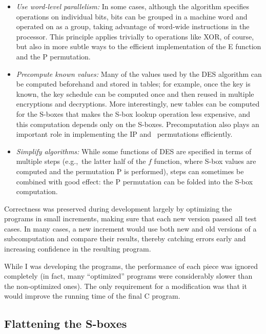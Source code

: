 \begin{itemize}
\item
{\em Use word-level parallelism:} In some cases, although the algorithm
specifies operations on individual bits, bits can be grouped in a
machine word and operated on as a group, taking advantage of word-wide
instructions in the processor.  This principle applies trivially to
operations like XOR, of course, but also in more subtle ways to the
efficient implementation of the E function and the P permutation.

\item
{\em Precompute known values:}  Many of the values used by the DES
algorithm can be computed beforehand and stored in tables; for example,
once the key is known, the key schedule can be computed once and then
reused in multiple encryptions and decryptions.  More interestingly,
new tables can be computed for the S-boxes that makes the S-box lookup
operation less expensive, and this computation depends only on the
S-boxes.  Precomputation also plays an important role in implementing the
IP and \ipinv\ permutations efficiently.

\item
{\em Simplify algorithms:} While some functions of DES are specified in
terms of multiple steps (e.g.,~the latter half of the $f$ function,
where S-box values are computed and the permutation P is performed), steps
can sometimes be combined with good effect: the P permutation can be
folded into the S-box computation.

\end{itemize}

Correctness was preserved during development largely by optimizing the
programs in small increments, making sure that each new version passed
all test cases.  In many cases, a new increment would use both new and
old versions of a subcomputation and compare their results, thereby
catching errors early and increasing confidence in the resulting
program.

While I was developing the programs, the performance of each piece was
ignored completely (in fact, many ``optimized'' programs were
considerably slower than the non-optimized ones).  The only requirement
for a modification was that it would improve the running time of
the final C program.


\subsection{Flattening the S-boxes}

